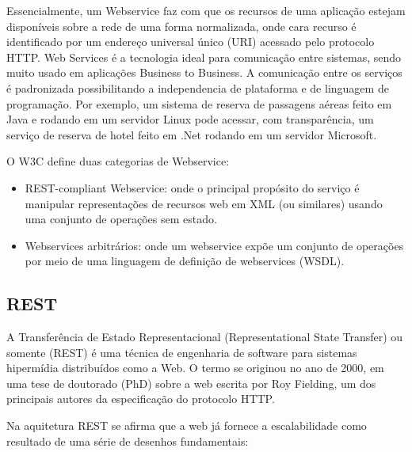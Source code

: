 Essencialmente, um Webservice faz com que os recursos de uma aplicação estejam disponíveis sobre a rede de uma forma normalizada, onde cara recurso é identificado por um endereço universal único (URI) acessado pelo protocolo HTTP. Web Services é a tecnologia ideal para comunicação entre sistemas, sendo muito usado em aplicações Business to Business. A comunicação entre os serviços é padronizada possibilitando a independencia de plataforma e de linguagem de programação. Por exemplo, um sistema de reserva de passagens aéreas feito em Java e rodando em um servidor Linux pode acessar, com transparência, um serviço de reserva de hotel feito em .Net rodando em um servidor Microsoft.

O W3C define duas categorias de Webservice:

\begin{itemize}
	\item REST-compliant Webservice: onde o principal propósito do serviço é manipular representações de recursos web em XML (ou similares) usando uma conjunto de operações sem estado.
		\item Webservices arbitrários: onde um webservice expõe um conjunto de operações por meio de uma linguagem de definição de webservices (WSDL).
\end{itemize}

\subsection{REST}

A Transferência de Estado Representacional (Representational State Transfer) ou somente (REST) é uma técnica de engenharia de software para sistemas hipermídia distribuídos como a Web. O termo se originou no ano de 2000, em uma tese de doutorado (PhD) sobre a web escrita por Roy Fielding, um dos principais autores da especificação do protocolo HTTP.

Na aquitetura REST se afirma que a web já fornece a escalabilidade como resultado de uma série de desenhos fundamentais:

